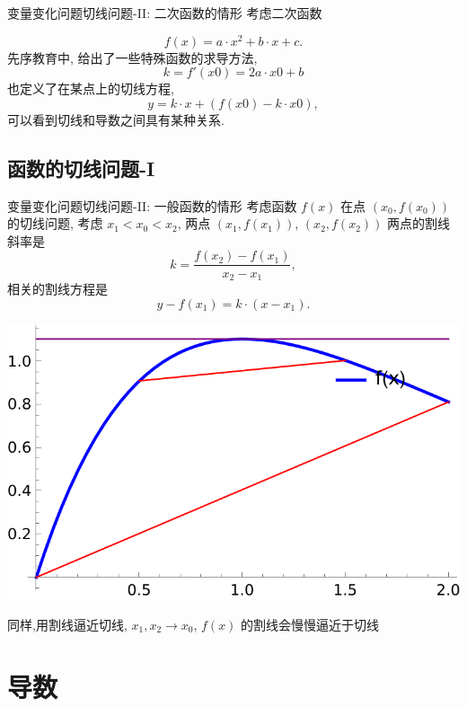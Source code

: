 \documentclass[
10pt,
aspectratio=43,
]{beamer}
\begin{document}
\begin{frame}{变量变化问题}{切线问题-II: 二次函数的情形}
	考虑二次函数
		
	\[
		f(x) = a\cdot x^2 + b\cdot x +c.	
	\]
	先序教育中, 给出了一些特殊函数的求导方法, 
	\[
		k = f'(x0) = 2  a \cdot x0 + b
	\]
	也定义了在某点上的切线方程,
	\[
		y = k \cdot x + (f(x0) - k \cdot x0),
	\]
	可以看到切线和导数之间具有某种关系.
\end{frame}


\subsection{函数的切线问题-I} %

\begin{frame}{变量变化问题}{切线问题-II: 一般函数的情形}
	考虑函数 $f(x)$ 在点 $(x_0,f(x_0))$ 的切线问题,
	考虑 $x_1<x_0<x_2$, 两点 $(x_1,f(x_1))$, $(x_2,f(x_2))$ 两点的割线斜率是
	\[
		k=\frac{f(x_2)-f(x_1)}{x_2-x_1},
	\]
	相关的割线方程是
	\[
		y-f(x_1)=k\cdot(x-x_1).
	\]
	
	\begin{center}
		\includegraphics[scale=0.5]{tangent secant.png}	
	\end{center}
	同样,用割线逼近切线, $x_1,x_2\to x_0$, $f(x)$ 的割线会慢慢逼近于切线
\end{frame}

\section{导数}
\end{document}
